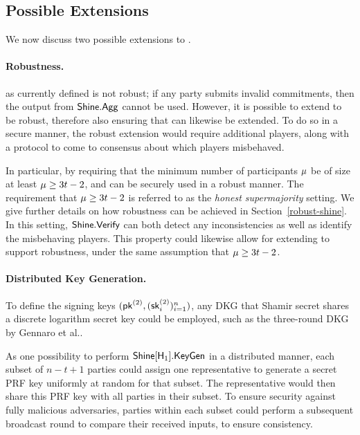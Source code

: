\subsection{Possible Extensions}
\label{extensions}

We now discuss two possible extensions to \glitter.

\paragraph{\bf Robustness.}
\glitter as currently defined is not robust;
if any party submits invalid commitments,
then the output from $\mathsf{Shine}.\mathsf{Agg}$ cannot be used.
%
However, it is possible to extend \DVRFOne to be robust,
therefore also ensuring that \glitter can likewise be extended.
To do so in a secure manner,
the robust extension would require additional players,
along with a protocol to come to consensus about which players misbehaved.

In particular,
by requiring that the minimum number of participants $\mu$ be of size at least $\mu \geq 3t-2$,
\DVRFOne and \glitter can be securely used in a robust manner.
The requirement that $\mu \geq 3t-2$ is referred to as the \emph{honest supermajority} setting.
%
We give further details on how robustness can be achieved in Section~\ref{robust-shine}.
%
In this setting,
$\mathsf{Shine}.\mathsf{Verify}$ can both detect any inconsistencies as well as identify the misbehaving players.
This property could likewise allow for extending \glitter to support robustness,
under the same assumption that $\mu \geq 3t-2$.

\paragraph{\bf Distributed Key Generation.}
To define the signing keys $(\mathsf{pk}^{(2)}, (\mathsf{sk}^{(2)}_i)_{i=1}^{n})$,
any DKG that Shamir secret shares a discrete logarithm secret key could be employed,
such as the three-round DKG by Gennaro et al.\cite{GennaroJKR07}.

As one possibility to perform $\mathsf{Shine}[\mathsf{H}_1].\mathsf{KeyGen}$ in a distributed manner,
each subset of $n-t+1$ parties could assign one representative to generate a secret PRF key uniformly at random for that subset.
The representative would then share this PRF key with all parties in their subset.
To ensure security against fully malicious adversaries,
parties within each subset could perform a subsequent broadcast round to compare their received inputs,
to ensure consistency.



